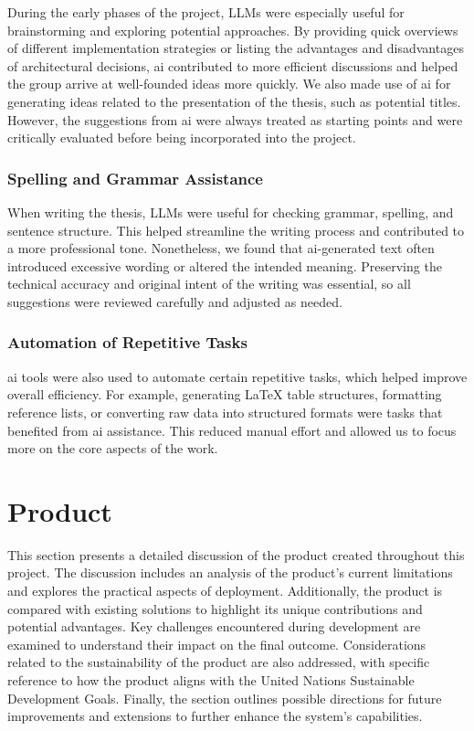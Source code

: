 During the early phases of the project, LLMs were especially useful for brainstorming and exploring potential approaches. By providing quick overviews of different implementation strategies or listing the advantages and disadvantages of architectural decisions, \acrshort{ai} contributed to more efficient discussions and helped the group arrive at well-founded ideas more quickly. We also made use of \acrshort{ai} for generating ideas related to the presentation of the thesis, such as potential titles. However, the suggestions from \acrshort{ai} were always treated as starting points and were critically evaluated before being incorporated into the project.

\subsubsection{Spelling and Grammar Assistance}

When writing the thesis, LLMs were useful for checking grammar, spelling, and sentence structure. This helped streamline the writing process and contributed to a more professional tone. Nonetheless, we found that \acrshort{ai}-generated text often introduced excessive wording or altered the intended meaning. Preserving the technical accuracy and original intent of the writing was essential, so all suggestions were reviewed carefully and adjusted as needed.

\subsubsection{Automation of Repetitive Tasks}

\acrshort{ai} tools were also used to automate certain repetitive tasks, which helped improve overall efficiency. For example, generating LaTeX table structures, formatting reference lists, or converting raw data into structured formats were tasks that benefited from \acrshort{ai} assistance. This reduced manual effort and allowed us to focus more on the core aspects of the work.

\section{Product}

This section presents a detailed discussion of the product created throughout this project. The discussion includes an analysis of the product's current limitations and explores the practical aspects of deployment. Additionally, the product is compared with existing solutions to highlight its unique contributions and potential advantages. Key challenges encountered during development are examined to understand their impact on the final outcome. Considerations related to the sustainability of the product are also addressed, with specific reference to how the product aligns with the United Nations Sustainable Development Goals. Finally, the section outlines possible directions for future improvements and extensions to further enhance the system's capabilities.


